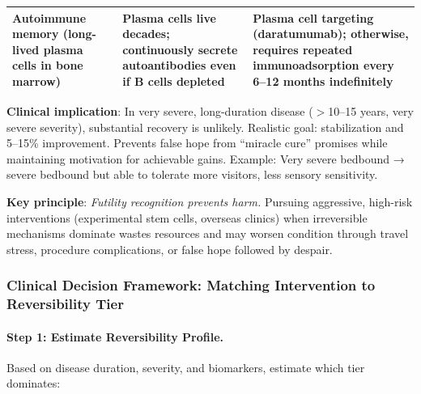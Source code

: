 \begin{table}[htbp]
\begin{tabular}{@{}p{3.5cm}p{5.5cm}p{4.5cm}@{}}
\addlinespace
Autoimmune memory (long-lived plasma cells in bone marrow) & Plasma cells live decades; continuously secrete autoantibodies even if B cells depleted & \textbf{Plasma cell targeting} (daratumumab); otherwise, requires repeated immunoadsorption every 6--12 months indefinitely \\
\bottomrule
\end{tabular}
\par\smallskip
\footnotesize{\textbf{Clinical implication}: In very severe, long-duration disease ($>$10--15 years, very severe severity), substantial recovery is unlikely. Realistic goal: stabilization and 5--15\% improvement. Prevents false hope from ``miracle cure'' promises while maintaining motivation for achievable gains. Example: Very severe bedbound → severe bedbound but able to tolerate more visitors, less sensory sensitivity.}
\end{table}

\textbf{Key principle}: \textit{Futility recognition prevents harm.} Pursuing aggressive, high-risk interventions (experimental stem cells, overseas clinics) when irreversible mechanisms dominate wastes resources and may worsen condition through travel stress, procedure complications, or false hope followed by despair.

\subsubsection{Clinical Decision Framework: Matching Intervention to Reversibility Tier}

\paragraph{Step 1: Estimate Reversibility Profile.}

Based on disease duration, severity, and biomarkers, estimate which tier dominates:


